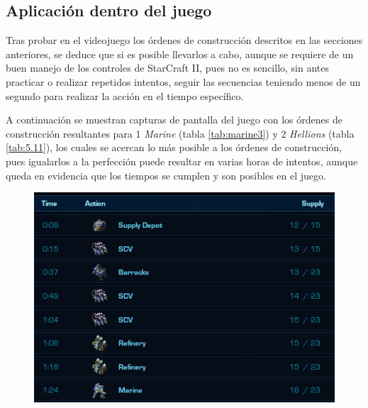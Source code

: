 \subsection{Aplicación dentro del juego}

Tras probar en el videojuego los órdenes de construcción descritos en las secciones anteriores, se deduce que si es posible llevarlos a cabo, aunque se requiere de un buen manejo de los controles de StarCraft II, pues no es sencillo, sin antes practicar o realizar repetidos intentos, seguir las secuencias teniendo menos de un segundo para realizar la acción en el tiempo específico.

A continuación se muestran capturas de pantalla del juego con los órdenes de construcción resultantes para 1 \textit{Marine} (tabla \ref{tab:marine3}) y 2 \textit{Hellions} (tabla \ref{tab:5.11}), los cuales se acercan lo más posible a los órdenes de construcción, pues igualarlos a la perfección puede resultar en varias horas de intentos, aunque queda en evidencia que los tiempos se cumplen y son posibles en el juego.

\begin{figure}[H]
	\centering
	\captionsetup{justification=centering}
	\includegraphics[keepaspectratio]{images/boMarine.png}
	\label{fig:marineIG}
\end{figure}

